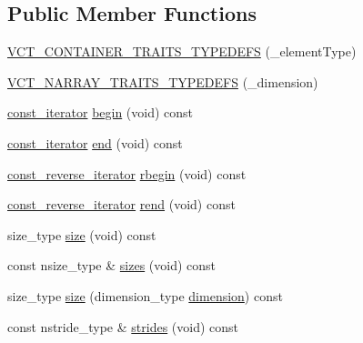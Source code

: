 \subsection*{Public Member Functions}
\begin{DoxyCompactItemize}
\item 
\hyperlink{classvct_dynamic_const_n_array_base_a5cdb79e03fb57c73c3237bd01ff50e03}{V\-C\-T\-\_\-\-C\-O\-N\-T\-A\-I\-N\-E\-R\-\_\-\-T\-R\-A\-I\-T\-S\-\_\-\-T\-Y\-P\-E\-D\-E\-F\-S} (\-\_\-element\-Type)
\item 
\hyperlink{classvct_dynamic_const_n_array_base_a2e30692dfe70824ff9944ab1ae28e100}{V\-C\-T\-\_\-\-N\-A\-R\-R\-A\-Y\-\_\-\-T\-R\-A\-I\-T\-S\-\_\-\-T\-Y\-P\-E\-D\-E\-F\-S} (\-\_\-dimension)
\item 
\hyperlink{classvct_dynamic_const_n_array_base_a026881a1dc4be02626681c9c3056395b}{const\-\_\-iterator} \hyperlink{classvct_dynamic_const_n_array_base_a8f52ab01f73c58e0452a3e188f4706a3}{begin} (void) const 
\item 
\hyperlink{classvct_dynamic_const_n_array_base_a026881a1dc4be02626681c9c3056395b}{const\-\_\-iterator} \hyperlink{classvct_dynamic_const_n_array_base_a612e11cdbe0b62a0664e5dffe83ff94d}{end} (void) const 
\item 
\hyperlink{classvct_dynamic_const_n_array_base_a133cecf87f369296ad391ce3b697466b}{const\-\_\-reverse\-\_\-iterator} \hyperlink{classvct_dynamic_const_n_array_base_afcfdf684aebc3c4c28dc25a21f0e98f7}{rbegin} (void) const 
\item 
\hyperlink{classvct_dynamic_const_n_array_base_a133cecf87f369296ad391ce3b697466b}{const\-\_\-reverse\-\_\-iterator} \hyperlink{classvct_dynamic_const_n_array_base_aeb140e4b00c498242a1b31c339f393f4}{rend} (void) const 
\item 
size\-\_\-type \hyperlink{classvct_dynamic_const_n_array_base_a1278ffc5ecb43149cb67da04a4700a34}{size} (void) const 
\item 
const nsize\-\_\-type \& \hyperlink{classvct_dynamic_const_n_array_base_aa86793343d80325ba5671bc24a2e0e8f}{sizes} (void) const 
\item 
size\-\_\-type \hyperlink{classvct_dynamic_const_n_array_base_a40a9f6fdb64ae5ad3bbb5349050cb901}{size} (dimension\-\_\-type \hyperlink{classvct_dynamic_const_n_array_base_aad976ad48dc9b1006d9e2729195f0b7c}{dimension}) const 
\item 
const nstride\-\_\-type \& \hyperlink{classvct_dynamic_const_n_array_base_a6608baee60a448ccb9598417c487cde2}{strides} (void) const 
\item 

\end{DoxyCompactItemize}
